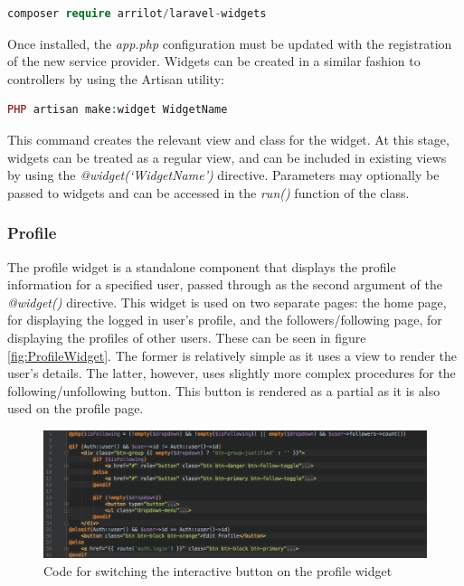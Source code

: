 \begin{lstlisting}[language=php]
 composer require arrilot/laravel-widgets
\end{lstlisting}

Once installed, the \textit{app.php} configuration must be updated with the registration of the new service provider. Widgets can be created in a similar fashion to controllers by using the Artisan utility:

\begin{lstlisting}[language=php]
 PHP artisan make:widget WidgetName
\end{lstlisting}

This command creates the relevant view and class for the widget. At this stage, widgets can be treated as a regular view, and can be included in existing views by using the \textit{@widget(`WidgetName')} directive. Parameters may optionally be passed to widgets and can be accessed in the \textit{run()} function of the class.

\subsubsection{Profile}
The profile widget is a standalone component that displays the profile information for a specified user, passed through as the second argument of the \textit{@widget()} directive. This widget is used on two separate pages: the home page, for displaying the logged in user's profile, and the followers/following page, for displaying the profiles of other users. These can be seen in figure \ref{fig:ProfileWidget}. The former is relatively simple as it uses a view to render the user's details. The latter, however, uses slightly more complex procedures for the following/unfollowing button. This button is rendered as a partial as it is also used on the profile page.

\begin{figure}[H]
    \centering
    \includegraphics[width=\textwidth]{Images/Implementation/UI/Widgets/Profile_Follow}
    \caption{Code for switching the interactive button on the profile widget}
    \label{fig:Profile_Follow}
\end{figure}

